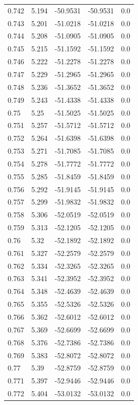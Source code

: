 \begin{table}[H]
\begin{tabular}{lllll}
0.742 & 5.194 & -50.9531 & -50.9531 & 0.0 \\
0.743 & 5.201 & -51.0218 & -51.0218 & 0.0 \\
0.744 & 5.208 & -51.0905 & -51.0905 & 0.0 \\
0.745 & 5.215 & -51.1592 & -51.1592 & 0.0 \\
0.746 & 5.222 & -51.2278 & -51.2278 & 0.0 \\
0.747 & 5.229 & -51.2965 & -51.2965 & 0.0 \\
0.748 & 5.236 & -51.3652 & -51.3652 & 0.0 \\
0.749 & 5.243 & -51.4338 & -51.4338 & 0.0 \\
0.75 & 5.25 & -51.5025 & -51.5025 & 0.0 \\
0.751 & 5.257 & -51.5712 & -51.5712 & 0.0 \\
0.752 & 5.264 & -51.6398 & -51.6398 & 0.0 \\
0.753 & 5.271 & -51.7085 & -51.7085 & 0.0 \\
0.754 & 5.278 & -51.7772 & -51.7772 & 0.0 \\
0.755 & 5.285 & -51.8459 & -51.8459 & 0.0 \\
0.756 & 5.292 & -51.9145 & -51.9145 & 0.0 \\
0.757 & 5.299 & -51.9832 & -51.9832 & 0.0 \\
0.758 & 5.306 & -52.0519 & -52.0519 & 0.0 \\
0.759 & 5.313 & -52.1205 & -52.1205 & 0.0 \\
0.76 & 5.32 & -52.1892 & -52.1892 & 0.0 \\
0.761 & 5.327 & -52.2579 & -52.2579 & 0.0 \\
0.762 & 5.334 & -52.3265 & -52.3265 & 0.0 \\
0.763 & 5.341 & -52.3952 & -52.3952 & 0.0 \\
0.764 & 5.348 & -52.4639 & -52.4639 & 0.0 \\
0.765 & 5.355 & -52.5326 & -52.5326 & 0.0 \\
0.766 & 5.362 & -52.6012 & -52.6012 & 0.0 \\
0.767 & 5.369 & -52.6699 & -52.6699 & 0.0 \\
0.768 & 5.376 & -52.7386 & -52.7386 & 0.0 \\
0.769 & 5.383 & -52.8072 & -52.8072 & 0.0 \\
0.77 & 5.39 & -52.8759 & -52.8759 & 0.0 \\
0.771 & 5.397 & -52.9446 & -52.9446 & 0.0 \\
0.772 & 5.404 & -53.0132 & -53.0132 & 0.0 \\

\end{tabular}
\end{table}
